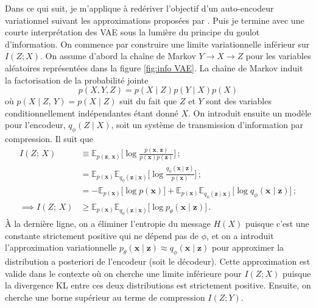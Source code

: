 Dans ce qui suit, je m'applique à redériver l'objectif d'un auto-encodeur variationnel suivant les approximations 
proposées par \citet{Alemi2017}. Puis je termine avec une courte interprétation des VAE sous la lumière du principe du goulot d'information.
On commence par construire une limite variationnelle inférieur sur $I(Z; X)$. 
On assume d'abord la chaîne de Markov $Y \rightarrow X \rightarrow Z$ pour les variables 
aléatoires représentées dans la figure \ref{fig:info VAE}. La chaîne de Markov 
induit la factorisation de la probabilité jointe
\begin{equation}\label{eq:factorisation}
       p(X, Y, Z) = p(X \mid Z) p(Y \mid X) p(X) 
\end{equation} 
où $p(X \mid Z,\, Y) = p(X \mid Z)$ suit du fait que $Z$ et $Y$ sont des variables conditionnellement indépendantes étant donné $X$.
On introduit ensuite un modèle pour l'encodeur,
$q_\phi (Z \mid X)$, soit un système de transmission d'information par compression. Il 
suit que 
\begin{align}
        I(Z;\, X) &\equiv \mathbb{E}_{p(\mathbf{z},\, \mathbf{x})} \bigg[\log \frac{p(\mathbf{x},\, \mathbf{z})}{p(\mathbf{x}) p(\mathbf{z})} \bigg]\, ;  \\[1.5ex]
        &= \mathbb{E}_{p(\mathbf{x})}\mathbb{E}_{q_\phi(\mathbf{z} \mid \mathbf{x})} \bigg[\log \frac{q_\phi(\mathbf{x} \mid \mathbf{z})}{p(\mathbf{x})} \bigg]\, ;  \\[1.5ex]
                &= -\mathbb{E}_{p(\mathbf{x})}\bigg[\log p(\mathbf{x}) \bigg]  
                + \mathbb{E}_{p(\mathbf{x})}\mathbb{E}_{q_\phi(\mathbf{z} \mid \mathbf{x})} \bigg[\log q_\phi(\mathbf{x} \mid \mathbf{z})\bigg]\, ;  \\[1.5ex]
                \label{eq:maximum info}
                \implies I(Z;\, X)&\geq \mathbb{E}_{p(\mathbf{x})}\mathbb{E}_{q_\phi(\mathbf{z} \mid \mathbf{x})} \bigg[\log p_\theta (\mathbf{x} \mid \mathbf{z})\bigg]\, .
\end{align}
À la dernière ligne, on a éliminer l'entropie du message $H(X)$ puisque c'est une constante strictement positive qui ne dépend pas de $\phi$, et 
on a introduit l'approximation variationnelle $p_\theta (\mathbf{x} \mid \mathbf{z}) \approx q_\phi (\mathbf{x} \mid \mathbf{z})$ 
pour approximer la distribution a posteriori de l'encodeur (soit le décodeur). Cette approximation est valide dans le contexte où 
on cherche une limite inférieure pour $I(Z; X)$ puisque la divergence KL entre ces deux distributions est strictement positive.
Ensuite, on cherche une borne supérieur au terme de compression $I(Z; Y)$. 
